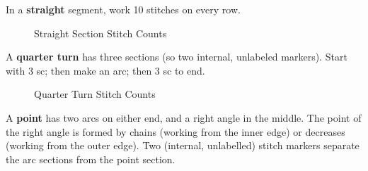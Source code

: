 \documentclass[openany]{book}
\begin{document}
In a \textbf{straight} segment, work 10 stitches on every row.
\begin{figure}[H]\centering
{}
\caption{Straight Section Stitch Counts}\label{fig:S}
\end{figure}
A \textbf{quarter turn} has three sections (so two internal, unlabeled markers). Start with 3 sc; then make an arc; then 3 sc to end.
\begin{figure}[H]\centering
{}
\caption{Quarter Turn Stitch Counts}\label{fig:Q}
\end{figure}
A \textbf{point} has two arcs on either end, and a right angle in the middle. The point of the right angle is formed by chains (working from the inner edge) or decreases (working from the outer edge). Two (internal, unlabelled) stitch markers separate the arc sections from the point section.
\end{document}
